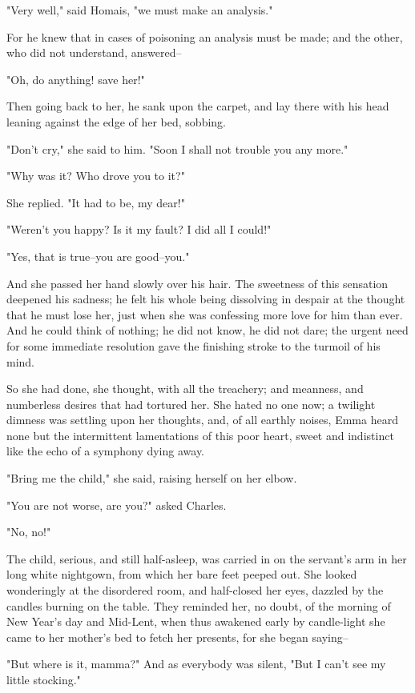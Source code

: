 \documentclass{tufte-book}
\begin{document}
"Very well," said Homais, "we must make an analysis."

For he knew that in cases of poisoning an analysis must be made; and the
other, who did not understand, answered--

"Oh, do anything! save her!"

Then going back to her, he sank upon the carpet, and lay there with his
head leaning against the edge of her bed, sobbing.

"Don't cry," she said to him. "Soon I shall not trouble you any more."

"Why was it? Who drove you to it?"

She replied. "It had to be, my dear!"

"Weren't you happy? Is it my fault? I did all I could!"

"Yes, that is true--you are good--you."

And she passed her hand slowly over his hair. The sweetness of this
sensation deepened his sadness; he felt his whole being dissolving
in despair at the thought that he must lose her, just when she was
confessing more love for him than ever. And he could think of nothing;
he did not know, he did not dare; the urgent need for some immediate
resolution gave the finishing stroke to the turmoil of his mind.

So she had done, she thought, with all the treachery; and meanness,
and numberless desires that had tortured her. She hated no one now; a
twilight dimness was settling upon her thoughts, and, of all earthly
noises, Emma heard none but the intermittent lamentations of this poor
heart, sweet and indistinct like the echo of a symphony dying away.

"Bring me the child," she said, raising herself on her elbow.

"You are not worse, are you?" asked Charles.

"No, no!"

The child, serious, and still half-asleep, was carried in on the
servant's arm in her long white nightgown, from which her bare
feet peeped out. She looked wonderingly at the disordered room, and
half-closed her eyes, dazzled by the candles burning on the table. They
reminded her, no doubt, of the morning of New Year's day and Mid-Lent,
when thus awakened early by candle-light she came to her mother's bed to
fetch her presents, for she began saying--

"But where is it, mamma?" And as everybody was silent, "But I can't see
my little stocking."
\end{document}
